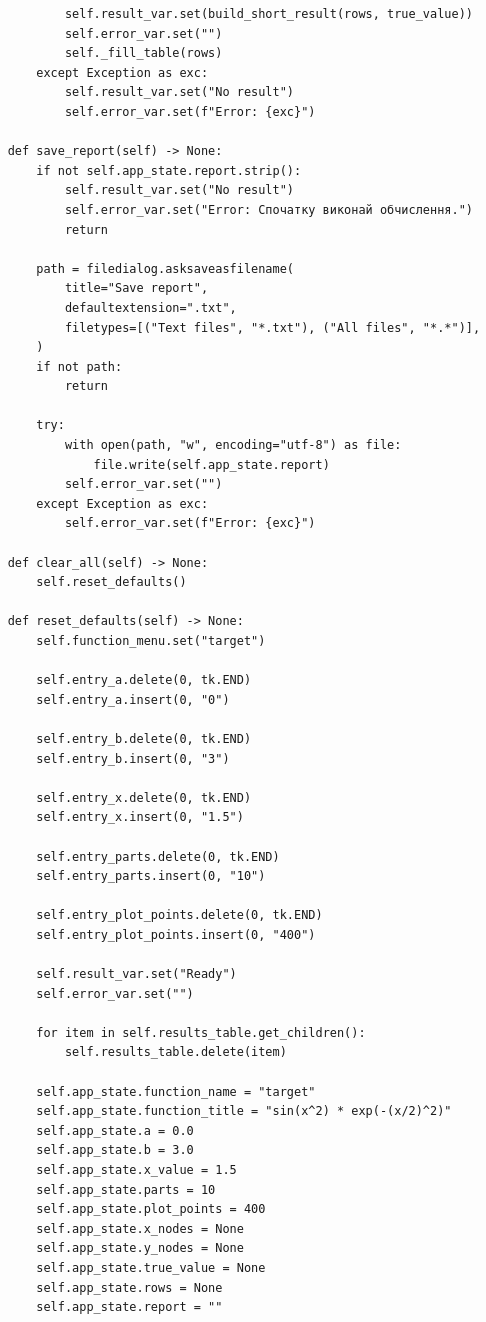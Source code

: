 \documentclass[12pt,a4paper]{article}
\begin{document}
\begin{verbatim}
            self.result_var.set(build_short_result(rows, true_value))
            self.error_var.set("")
            self._fill_table(rows)
        except Exception as exc:
            self.result_var.set("No result")
            self.error_var.set(f"Error: {exc}")

    def save_report(self) -> None:
        if not self.app_state.report.strip():
            self.result_var.set("No result")
            self.error_var.set("Error: Спочатку виконай обчислення.")
            return

        path = filedialog.asksaveasfilename(
            title="Save report",
            defaultextension=".txt",
            filetypes=[("Text files", "*.txt"), ("All files", "*.*")],
        )
        if not path:
            return

        try:
            with open(path, "w", encoding="utf-8") as file:
                file.write(self.app_state.report)
            self.error_var.set("")
        except Exception as exc:
            self.error_var.set(f"Error: {exc}")

    def clear_all(self) -> None:
        self.reset_defaults()

    def reset_defaults(self) -> None:
        self.function_menu.set("target")

        self.entry_a.delete(0, tk.END)
        self.entry_a.insert(0, "0")

        self.entry_b.delete(0, tk.END)
        self.entry_b.insert(0, "3")

        self.entry_x.delete(0, tk.END)
        self.entry_x.insert(0, "1.5")

        self.entry_parts.delete(0, tk.END)
        self.entry_parts.insert(0, "10")

        self.entry_plot_points.delete(0, tk.END)
        self.entry_plot_points.insert(0, "400")

        self.result_var.set("Ready")
        self.error_var.set("")

        for item in self.results_table.get_children():
            self.results_table.delete(item)

        self.app_state.function_name = "target"
        self.app_state.function_title = "sin(x^2) * exp(-(x/2)^2)"
        self.app_state.a = 0.0
        self.app_state.b = 3.0
        self.app_state.x_value = 1.5
        self.app_state.parts = 10
        self.app_state.plot_points = 400
        self.app_state.x_nodes = None
        self.app_state.y_nodes = None
        self.app_state.true_value = None
        self.app_state.rows = None
        self.app_state.report = ""


\end{verbatim}
\end{document}
